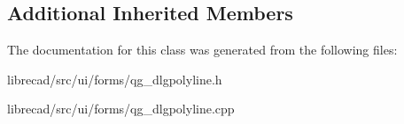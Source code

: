 \subsection*{Additional Inherited Members}


The documentation for this class was generated from the following files\-:\begin{DoxyCompactItemize}
\item 
librecad/src/ui/forms/qg\-\_\-dlgpolyline.\-h\item 
librecad/src/ui/forms/qg\-\_\-dlgpolyline.\-cpp\end{DoxyCompactItemize}
